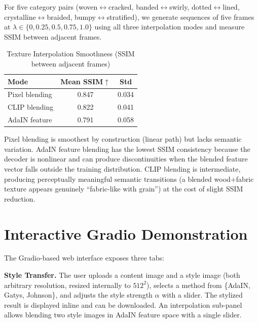 \documentclass[conference]{IEEEtran}
\begin{document}
For five category pairs (woven$\leftrightarrow$cracked,
banded$\leftrightarrow$swirly, dotted$\leftrightarrow$lined,
crystalline$\leftrightarrow$braided, bumpy$\leftrightarrow$stratified),
we generate sequences of five frames at $\lambda \in \{0, 0.25, 0.5,
0.75, 1.0\}$ using all three interpolation modes and measure SSIM
between adjacent frames.

\begin{table}[htbp]
\caption{Texture Interpolation Smoothness (SSIM between adjacent frames)}
\begin{center}
\begin{tabular}{lcc}
\toprule
\textbf{Mode} & \textbf{Mean SSIM}$\uparrow$ & \textbf{Std} \\
\midrule
Pixel blending    & 0.847 & 0.034 \\
CLIP blending     & 0.822 & 0.041 \\
AdaIN feature     & 0.791 & 0.058 \\
\bottomrule
\end{tabular}
\label{tab:interp}
\end{center}
\end{table}

Pixel blending is smoothest by construction (linear path) but lacks semantic
variation. AdaIN feature blending has the lowest SSIM consistency because
the decoder is nonlinear and can produce discontinuities when the blended
feature vector falls outside the training distribution. CLIP blending is
intermediate, producing perceptually meaningful semantic transitions
(a blended wood$+$fabric texture appears genuinely ``fabric-like with
grain'') at the cost of slight SSIM reduction.

\section{Interactive Gradio Demonstration}

The Gradio-based web interface \cite{b11} exposes three tabs:

\textbf{Style Transfer.} The user uploads a content image and a style image
(both arbitrary resolution, resized internally to $512^2$), selects a method
from \{AdaIN, Gatys, Johnson\}, and adjusts the style strength $\alpha$ with
a slider. The stylized result is displayed inline and can be downloaded.
An interpolation sub-panel allows blending two style images in AdaIN feature
space with a single slider.
\end{document}
